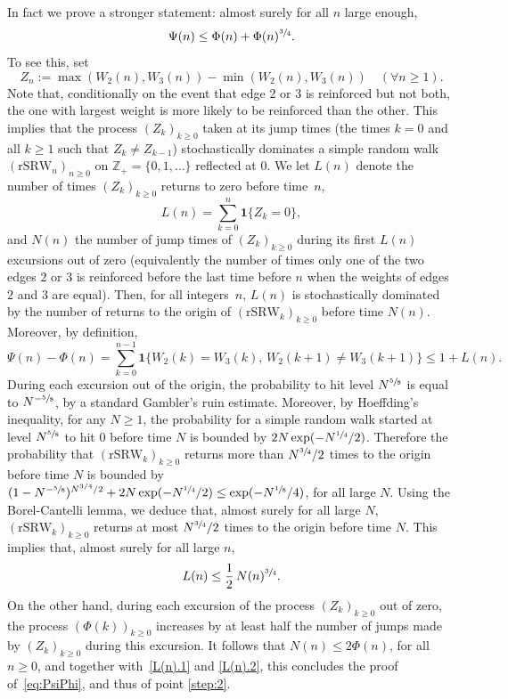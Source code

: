 \documentclass[JEP,XML,SOM,Unicode,NoFloatCountersInSection,published]{cedram}
\let \nicefrac\sfrac
\numberwithin{equation}{section}
\theoremstyle{definition}
\let\bs\boldsymbol
\begin{document}
In fact we prove a stronger statement: almost surely for all $n$ large enough,
\begin{equation}\label{eq:PsiPhi}
\Psi(n) \le \Phi(n) + \Phi(n)^{\nicefrac34}.
\end{equation}
To see this, set
\[
Z_n := \max(W_2(n) , W_3(n)) - \min(W_2(n),W_3(n))\quad (\forall n\geq 1).
\]
Note that, conditionally on the event that edge $2$ or $3$ is reinforced but not both,
the one with largest weight is more likely to be reinforced than the other.
This implies that the process $(Z_k)_{k\ge 0}$ taken at its jump times (\ie the times $k=0$ and all $k\geq 1$ such that $Z_k\neq Z_{k-1}$)
stochastically dominates a simple random walk $(\mathrm{rSRW}_n)_{n\geq 0}$
on $\mathbb Z_+=\{0,1,\dots\}$ reflected at $0$.
We let $L(n)$ denote the number of times $(Z_k)_{k\ge 0}$ returns to zero before time~$n$, \ie
\[
L(n) = \sum_{k=0}^n \bs 1\{Z_k = 0\},
\]
and $N(n)$ the number of jump times of $(Z_k)_{k\ge 0}$ during its first $L(n)$ excursions out of zero
(equivalently the number of times only one of the two edges $2$ or $3$ is reinforced before the last time before $n$ when the weights of edges $2$ and $3$ are equal).
Then, for all integers~$n$, $L(n)$ is stochastically dominated by the number of returns to the origin of $(\mathrm{rSRW}_k)_{k\geq 0}$ before time $N(n)$.
Moreover, by definition,
\begin{equation}\label{L(n).1}
\Psi(n) - \Phi(n) = \sum_{k=0}^{n-1} \bs 1\{W_2(k) = W_3(k), \, W_2(k+1)\neq W_3(k+1)\} \le 1+ L(n).
\end{equation}
During each excursion out of the origin,
the probability to hit level $N^{\nicefrac58}$ is equal to $N^{-\nicefrac58}$, by a standard Gambler's ruin estimate. Moreover, by Hoeffding's inequality, for any $N\ge 1$,
the probability for a simple random walk started at level $N^{\nicefrac58}$ to hit $0$ before time $N$ is bounded by $2N\exp(-N^{\nicefrac14}/2)$.
Therefore the probability that
$(\mathrm{rSRW}_k)_{k\geq 0}$ returns more than $N^{\nicefrac34}/2$ times to the origin before time $N$ is bounded by $(1-N^{-\nicefrac58})^{N^{3/4}/2}+2N\exp(-N^{\nicefrac14}/2) \le \exp(-N^{\nicefrac18}/4)$, for all large $N$.
Using {the} Borel-Cantelli lemma, we deduce that, almost surely for all large $N$, $(\mathrm{rSRW}_k)_{k\geq 0}$ returns at most $N^{\nicefrac34}/2$ times to the origin before time $N$.
This implies that,
almost surely for all large $n$,
\begin{equation}\label{L(n).2}
L(n) \le \frac12\, N(n)^{\nicefrac 34}.
\end{equation}
On the other hand, during each excursion of the process $(Z_k)_{k\ge 0}$ out of zero, the process $(\Phi(k))_{k\ge 0}$ increases by at least half the number of jumps made by $(Z_k)_{k\ge 0}$ during this excursion. It follows that $N(n)\le 2\Phi(n)$, for all $n\ge 0$, and together with~\eqref{L(n).1} and \eqref{L(n).2}, this concludes the proof of~\eqref{eq:PsiPhi}, and thus of point \eqref{step:2}.
\end{document}
